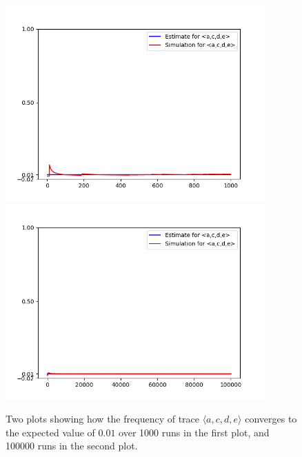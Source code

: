 \begin{figure}%
    \centering
    {{\includegraphics[width=10cm]{figures/acde1.png} }}%
    \qquad
    {{\includegraphics[width=10cm]{figures/acde100.png} }}%
    \caption{Two plots showing how the frequency of trace $\langle a,c,d,e \rangle$ converges to the expected value of $0.01$ over 1000 runs in the first plot, and 100000 runs in the second plot.}%
    \label{fig: acde}%
\end{figure}
%
%
%
%
%
%
